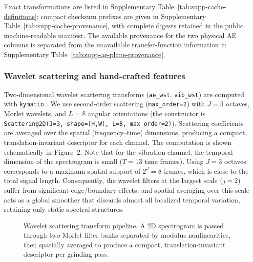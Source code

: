 Exact transformations are listed in Supplementary
Table~\ref{tab:supp-cache-definitions}; compact checksum prefixes are given in
Supplementary Table~\ref{tab:supp-cache-provenance}, with complete digests
retained in the public machine-readable manifest.
The available provenance for the two physical AE columns is separated from
the unavailable transfer-function information in Supplementary
Table~\ref{tab:supp-ae-plane-provenance}.

\subsubsection{Wavelet scattering and hand-crafted features}

Two-dimensional wavelet scattering transforms
(\texttt{ae\_wst}, \texttt{vib\_wst}) are computed with
\texttt{kymatio} \cite{mallat2012group}. We use second-order scattering
(\texttt{max\_order=2}) with $J=3$ octaves, Morlet wavelets, and
$L=8$ angular orientations (the constructor is
\texttt{Scattering2D(J=3, shape=(H,W), L=8, max\_order=2)}). Scattering coefficients are averaged over the
spatial (frequency--time) dimensions, producing a compact,
translation-invariant descriptor for each channel. The computation is
shown schematically in Figure~2. Note that for the vibration channel, the temporal dimension of the spectrogram is small ($T=13$ time frames). Using $J=3$ octaves corresponds to a maximum spatial support of $2^J = 8$ frames, which is close to the total signal length. Consequently, the wavelet filters at the largest scale ($j=2$) suffer from significant edge/boundary effects, and spatial averaging over this scale acts as a global smoother that discards almost all localized temporal variation, retaining only static spectral structures.

\begin{figure}[htbp]
\centering
\resizebox{\linewidth}{!}{}
\caption{Wavelet scattering transform pipeline. A 2D spectrogram is
passed through two Morlet filter banks separated by modulus
nonlinearities, then spatially averaged to produce a compact,
translation-invariant descriptor per grinding pass.}
\label{fig:wst-pipeline}
\end{figure}


